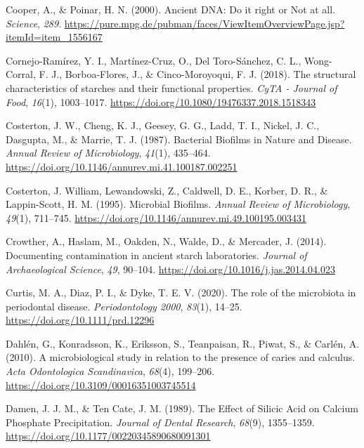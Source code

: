 \documentclass[
  letterpaper,
]{book}
\newlength{\cslhangindent}
\newlength{\cslentryspacingunit} %
\newenvironment{CSLReferences}[2] %
 {%
  \setlength{\parindent}{0pt}
  \ifodd #1
  \let\oldpar\par
  \def\par{\hangindent=\cslhangindent\oldpar}
  \fi
  \setlength{\parskip}{#2\cslentryspacingunit}
 }%
 {}
\begin{document}
\begin{CSLReferences}{1}{0}
\leavevmode{}%
Cooper, A., \& Poinar, H. N. (2000). Ancient {DNA}: {Do} it right or
{Not} at all. \emph{Science}, \emph{289}.
\url{https://pure.mpg.de/pubman/faces/ViewItemOverviewPage.jsp?itemId=item_1556167}

\leavevmode{}%
Cornejo-Ramírez, Y. I., Martínez-Cruz, O., Del Toro-Sánchez, C. L.,
Wong-Corral, F. J., Borboa-Flores, J., \& Cinco-Moroyoqui, F. J. (2018).
The structural characteristics of starches and their functional
properties. \emph{CyTA - Journal of Food}, \emph{16}(1), 1003--1017.
\url{https://doi.org/10.1080/19476337.2018.1518343}

\leavevmode{}%
Costerton, J. W., Cheng, K. J., Geesey, G. G., Ladd, T. I., Nickel, J.
C., Dasgupta, M., \& Marrie, T. J. (1987). Bacterial {Biofilms} in
{Nature} and {Disease}. \emph{Annual Review of Microbiology},
\emph{41}(1), 435--464.
\url{https://doi.org/10.1146/annurev.mi.41.100187.002251}

\leavevmode{}%
Costerton, J. William, Lewandowski, Z., Caldwell, D. E., Korber, D. R.,
\& Lappin-Scott, H. M. (1995). Microbial {Biofilms}. \emph{Annual Review
of Microbiology}, \emph{49}(1), 711--745.
\url{https://doi.org/10.1146/annurev.mi.49.100195.003431}

\leavevmode{}%
Crowther, A., Haslam, M., Oakden, N., Walde, D., \& Mercader, J. (2014).
Documenting contamination in ancient starch laboratories. \emph{Journal
of Archaeological Science}, \emph{49}, 90--104.
\url{https://doi.org/10.1016/j.jas.2014.04.023}

\leavevmode{}%
Curtis, M. A., Diaz, P. I., \& Dyke, T. E. V. (2020). The role of the
microbiota in periodontal disease. \emph{Periodontology 2000},
\emph{83}(1), 14--25. \url{https://doi.org/10.1111/prd.12296}

\leavevmode{}%
Dahlén, G., Konradsson, K., Eriksson, S., Teanpaisan, R., Piwat, S., \&
Carlén, A. (2010). A microbiological study in relation to the presence
of caries and calculus. \emph{Acta Odontologica Scandinavica},
\emph{68}(4), 199--206. \url{https://doi.org/10.3109/00016351003745514}

\leavevmode{}%
Damen, J. J. M., \& Ten Cate, J. M. (1989). The {Effect} of {Silicic
Acid} on {Calcium Phosphate Precipitation}. \emph{Journal of Dental
Research}, \emph{68}(9), 1355--1359.
\url{https://doi.org/10.1177/00220345890680091301}


\end{CSLReferences}
\end{document}
